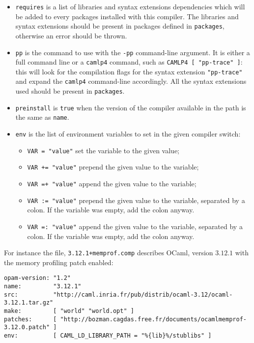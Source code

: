\documentclass[a4paper,10pt]{article}
\begin{document}
\begin{itemize}
\item {\tt requires} is a list of libraries and syntax extensions
  dependencies which will be added to every packages installed with
  this compiler. The libraries and syntax extensions should be present
  in packages defined in {\tt packages}, otherwise an error should be
  thrown.

\item {\tt pp} is the command to use with the {\tt -pp} command-line
  argument. It is either a full command line or a {\tt camlp4} command,
  such as \verb+CAMLP4 [ "pp-trace" ]+: this will look for the
  compilation flags for the syntax extension \verb+"pp-trace"+ and expand
  the {\tt camlp4} command-line accordingly. All the syntax extensions used
  should be present in {\tt packages}.

\item {\tt preinstall} is {\tt true} when the version of the compiler available
  in the path is the same as {\tt name}.

\item {\tt env} is the list of environment variables to set in the
  given compiler switch:
\begin{itemize}
\item {\tt VAR = "value"} set the variable to the given value;
\item {\tt VAR += "value"} prepend the given value to the variable;
\item {\tt VAR =+ "value"} append the given value to the variable;
\item {\tt VAR := "value"} prepend the given value to the variable,
  separated by a colon. If the variable was empty, add the
  colon anyway.
\item {\tt VAR =: "value"} append the given value to the variable,
  separated by a colon. If the variable was empty, add the colon
  anyway.
\end{itemize}
\end{itemize}

For instance the file, {\tt 3.12.1+memprof.comp} describes OCaml,
version $3.12.1$ with the memory profiling patch enabled:

\begin{verbatim}
opam-version: "1.2"
name:         "3.12.1"
src:          "http://caml.inria.fr/pub/distrib/ocaml-3.12/ocaml-3.12.1.tar.gz"
make:         [ "world" "world.opt" ]
patches:      [ "http://bozman.cagdas.free.fr/documents/ocamlmemprof-3.12.0.patch" ]
env:          [ CAML_LD_LIBRARY_PATH = "%{lib}%/stublibs" ]
\end{verbatim}
\end{document}
